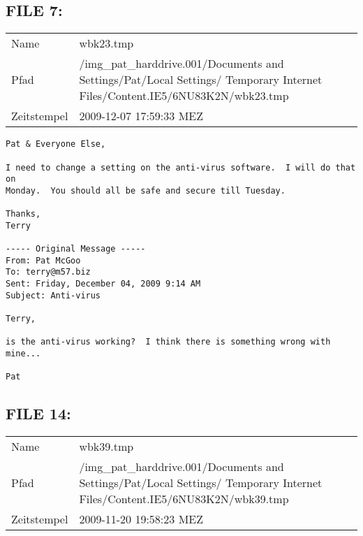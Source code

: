 \subsection{FILE 7:}	

\begin{table}[htb]
	\begin{tabular}{p{2cm} p{13.5cm}}
		Name & wbk23.tmp\\
		Pfad & /img_pat_harddrive.001/Documents and Settings/Pat/Local Settings/ Temporary Internet Files/Content.IE5/6NU83K2N/wbk23.tmp\\
		Zeitstempel & 2009-12-07 17:59:33 MEZ
	\end{tabular}
\end{table}	

\begin{lstlisting}
Pat & Everyone Else,

I need to change a setting on the anti-virus software.  I will do that on 
Monday.  You should all be safe and secure till Tuesday.

Thanks,
Terry

----- Original Message -----
From: Pat McGoo
To: terry@m57.biz
Sent: Friday, December 04, 2009 9:14 AM
Subject: Anti-virus

Terry,

is the anti-virus working?  I think there is something wrong with
mine...

Pat

\end{lstlisting}

\subsection{FILE 14:}	

\begin{table}[htb]
	\begin{tabular}{p{2cm} p{13.5cm}}
		Name & wbk39.tmp\\
		Pfad & /img_pat_harddrive.001/Documents and Settings/Pat/Local Settings/ Temporary Internet Files/Content.IE5/6NU83K2N/wbk39.tmp\\
		Zeitstempel & 2009-11-20 19:58:23 MEZ
	\end{tabular}
\end{table}	

